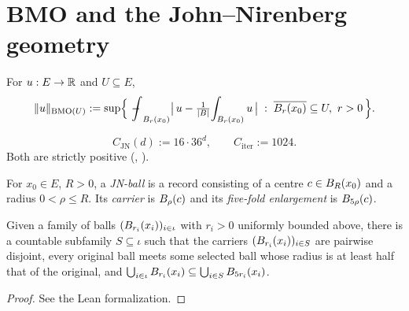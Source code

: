 \section{BMO and the John--Nirenberg geometry}

\begin{definition}
\label{def:bmoNorm}
\leanok
For $u : E \to \mathbb{R}$ and $U \subseteq E$,
\begin{equation*}
\lVert u\rVert_{\mathrm{BMO}(U)}
:= \sup\Bigl\{\, \fint_{\Ball{r}{x_0}} \bigl|\, u - \tfrac{1}{|B|}\!\int_{\Ball{r}{x_0}} u\,\bigr|
\;:\; \overline{\Ball{r}{x_0}} \subseteq U,\ r > 0\,\Bigr\}.
\end{equation*}
\end{definition}

\begin{definition}
\label{def:C_JN}
\leanok
\begin{equation*}
C_{\mathrm{JN}}(d) := 16 \cdot 36^{d}, \qquad C_{\mathrm{iter}} := 1024.
\end{equation*}
Both are strictly positive (, ).
\end{definition}

\begin{definition}
\label{def:JNBall}
\leanok
For $x_0 \in E$, $R > 0$, a \emph{JN-ball} is a record consisting of a centre
$c \in B_{R}(x_0)$ and a radius $0 < \rho \le R$. Its \emph{carrier} is
$B_{\rho}(c)$ and its \emph{five-fold enlargement} is $B_{5\rho}(c)$.
\end{definition}

\begin{lemma}
\label{lem:vitali_covering_lemma}
\leanok
Given a family of balls $(B_{r_i}(x_i))_{i \in \iota}$ with $r_i > 0$ uniformly bounded
above, there is a countable subfamily $S \subseteq \iota$ such that the carriers
$(B_{r_i}(x_i))_{i \in S}$ are pairwise disjoint, every original ball meets some
selected ball whose radius is at least half that of the original, and
$\bigcup_{i \in \iota} B_{r_i}(x_i) \subseteq \bigcup_{i \in S} B_{5 r_i}(x_i)$.
\end{lemma}

\begin{proof}
\leanok
See the Lean formalization.
\end{proof}

